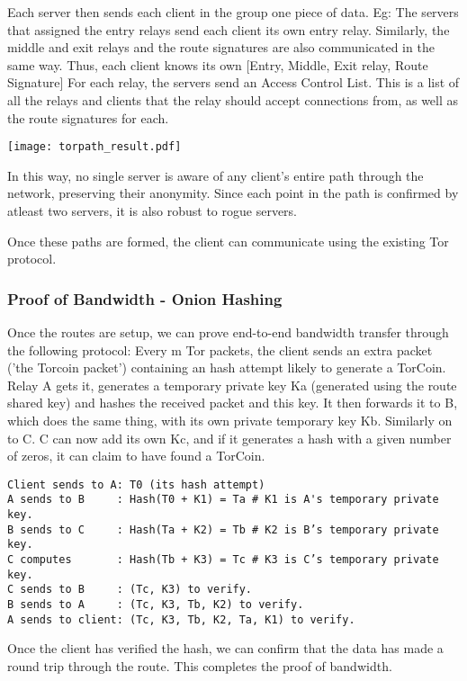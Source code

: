 Each server then sends each client in the group one piece of data. Eg: The servers that assigned the entry relays send each client its own entry relay. Similarly, the middle and exit relays and the route signatures are also communicated in the same way. Thus, each client knows its own [Entry, Middle, Exit relay, Route Signature] 
For each relay, the servers send an Access Control List. This is a list of all the relays and clients that the relay should accept connections from, as well as the route signatures for each.

\texttt{[image: torpath\_result.pdf]}

In this way, no single server is aware of any client's entire path through the network, preserving their anonymity. Since each point in the path is confirmed by atleast two servers, it is also robust to rogue servers.

Once these paths are formed, the client can communicate using the existing Tor protocol. 

\subsubsection{Proof of Bandwidth - Onion Hashing}
Once the routes are setup, we can prove end-to-end bandwidth transfer through the following protocol:
Every m Tor packets, the client sends an extra packet ('the Torcoin packet') containing an hash attempt likely to generate a TorCoin. Relay A gets it, generates a temporary private key Ka (generated using the route shared key) and hashes the received packet and this key. It then forwards it to B, which does the same thing, with its own private temporary key Kb. Similarly on to C. C can now add its own Kc, and if it generates a hash with a given number of zeros, it can claim to have found a TorCoin.
\begin{verbatim}
Client sends to A: T0 (its hash attempt)
A sends to B     : Hash(T0 + K1) = Ta # K1 is A's temporary private key.
B sends to C     : Hash(Ta + K2) = Tb # K2 is B’s temporary private key.
C computes       : Hash(Tb + K3) = Tc # K3 is C’s temporary private key.
C sends to B     : (Tc, K3) to verify.
B sends to A     : (Tc, K3, Tb, K2) to verify.
A sends to client: (Tc, K3, Tb, K2, Ta, K1) to verify.
\end{verbatim}
Once the client has verified the hash, we can confirm that the data has made a 
round trip through the route. This completes the proof of bandwidth.

